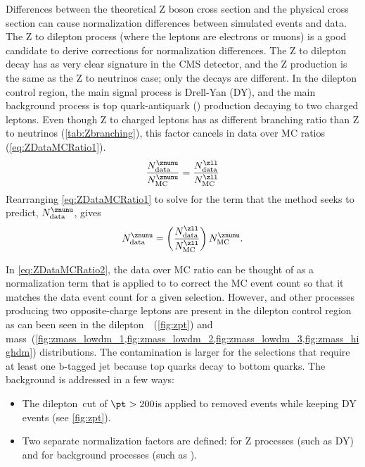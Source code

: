 Differences between the theoretical Z boson cross section and the physical cross section can cause normalization differences between simulated events and data.
The Z to dilepton process (where the leptons are electrons or muons) is a good candidate to derive corrections for normalization differences.
The Z to dilepton decay has as very clear signature in the CMS detector, and the Z production is the same as the Z to neutrinos case; only the decays are different.
In the dilepton control region, the main signal process is Drell-Yan (DY), and the main background process is top quark-antiquark (\ttbar) production decaying to two charged leptons.
Even though Z to charged leptons has as different branching ratio than Z to neutrinos (\cref{tab:Zbranching}), this factor cancels in data over MC ratios (\cref{eq:ZDataMCRatio1}).
\begin{align}
\label{eq:ZDataMCRatio1}
\frac{N_{\mathrm{data}}^{\znunu}}{N_{\mathrm{MC}}^{\znunu}} = \frac{N_{\mathrm{data}}^{\zll}}{N_{\mathrm{MC}}^{\zll}}
\end{align}
Rearranging \cref{eq:ZDataMCRatio1} to solve for the term that the method seeks to predict, $N_{\mathrm{data}}^{\znunu}$, gives
\begin{align}
\label{eq:ZDataMCRatio2}
N_{\mathrm{data}}^{\znunu} = \left(\frac{N_{\mathrm{data}}^{\zll}}{N_{\mathrm{MC}}^{\zll}}\right) N_{\mathrm{MC}}^{\znunu}.
\end{align}

In \cref{eq:ZDataMCRatio2}, the \zll data over MC ratio can be thought of as a normalization term that is applied to \znunu to correct the MC event count so that it matches the data event count for a given selection.
However, \ttbar and other processes producing two opposite-charge leptons are present in the dilepton control region as can been seen in the dilepton~\pt~(\cref{fig:zpt}) and mass~(\cref{fig:zmass_lowdm_1,fig:zmass_lowdm_2,fig:zmass_lowdm_3,fig:zmass_highdm}) distributions.
The \ttbar contamination is larger for the selections that require at least one b-tagged jet because top quarks decay to bottom quarks.
The \ttbar background is addressed in a few ways:
\begin{itemize}
\item The dilepton~\pt cut of $\pt > 200$\GeV is applied to removed \ttbar events while keeping DY events (see \cref{fig:zpt}).
\item Two separate normalization factors are defined: \RZ for Z processes (such as DY) and \RT for background processes (such as \ttbar).
\end{itemize}

